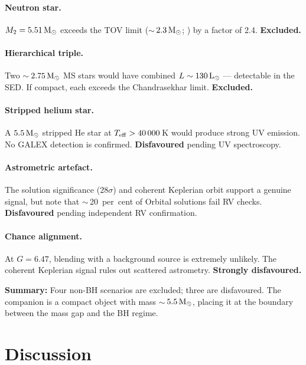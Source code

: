 \documentclass[usenatbib,fleqn]{mnras}
\newcommand{\Msun}{{\rm M}_\odot}
\newcommand{\Lsun}{{\rm L}_\odot}
\begin{document}
\paragraph{Neutron star.}
$M_2 = 5.51\,\Msun$ exceeds the TOV limit ($\sim$\,$2.3\,\Msun$;
\citealt{Rezzolla2018}) by a factor of 2.4.  \textbf{Excluded.}

\paragraph{Hierarchical triple.}
Two $\sim$\,$2.75\,\Msun$ MS stars would have combined
$L \sim 130\,\Lsun$ --- detectable in the SED.  If compact,
each exceeds the Chandrasekhar limit.  \textbf{Excluded.}

\paragraph{Stripped helium star.}
A $5.5\,\Msun$ stripped He star at $T_{\rm eff} > 40\,000$\,K
would produce strong UV emission.  No GALEX detection is confirmed.
\textbf{Disfavoured} pending UV spectroscopy.

\paragraph{Astrometric artefact.}
The solution significance ($28\sigma$) and coherent Keplerian orbit
support a genuine signal, but \citet{ElBadry2024} note that
$\sim$\,20~per~cent of Orbital solutions fail RV checks.
\textbf{Disfavoured} pending independent RV confirmation.

\paragraph{Chance alignment.}
At $G = 6.47$, blending with a background source is extremely
unlikely.  The coherent Keplerian signal rules out scattered
astrometry.  \textbf{Strongly disfavoured.}

\medskip\noindent
\textbf{Summary:} Four non-BH scenarios are excluded; three are
disfavoured.  The companion is a compact object with mass
$\sim$\,$5.5\,\Msun$, placing it at the boundary between the
mass gap and the BH regime.

\section{Discussion}
\label{sec:discussion}
\end{document}
